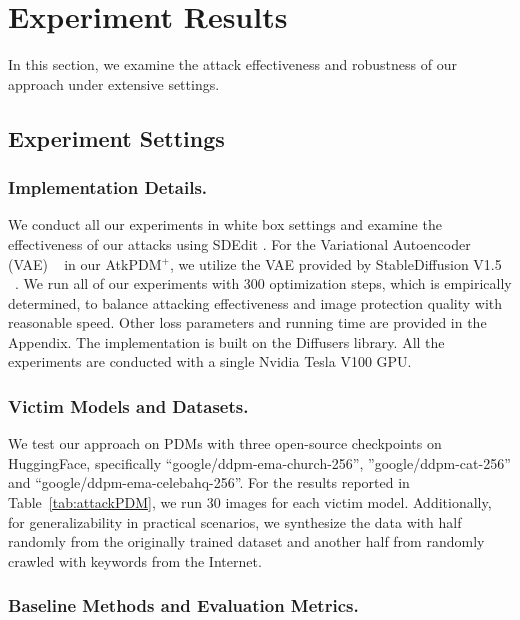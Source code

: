 \section{Experiment Results}
In this section, we examine the attack effectiveness and robustness of our approach under extensive settings. 








\subsection{Experiment Settings}
\subsubsection{Implementation Details.} We conduct all our experiments in white box settings and examine the effectiveness of our attacks using SDEdit \cite{meng2021sdedit}. For the Variational Autoencoder (VAE) ~\cite{kingma2014autoencoding} in our AtkPDM$^{+}$, we utilize the VAE provided by StableDiffusion V1.5 ~\cite{rombach2022high}.
We run all of our experiments with 300 optimization steps, which is empirically determined, to balance attacking effectiveness and image protection quality with reasonable speed. Other loss parameters and running time are provided in the Appendix. The implementation is built on the Diffusers library. All the experiments are conducted with a single Nvidia Tesla V100 GPU.


\subsubsection{Victim Models and Datasets.}
We test our approach on PDMs with three open-source checkpoints on HuggingFace, specifically ``google/ddpm-ema-church-256'', ''google/ddpm-cat-256'' and ``google/ddpm-ema-celebahq-256''. For the results reported in Table~\ref{tab:attackPDM}, we run 30 images for each victim model. Additionally, for generalizability in practical scenarios, we synthesize the data with half randomly from the originally trained dataset and another half from randomly crawled with keywords from the Internet.

\subsubsection{Baseline Methods and Evaluation Metrics.}

